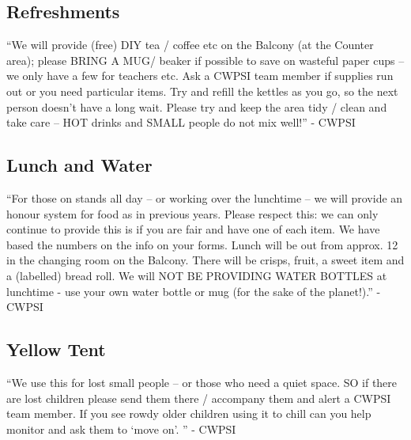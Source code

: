 \documentclass[a4paper]{article}
\begin{document}
\subsection*{Refreshments}
``We will provide (free) DIY tea / coffee etc on the Balcony (at the Counter area); please BRING A MUG/ beaker if possible to save on wasteful paper cups – we only have a few for teachers etc.   Ask a CWPSI team member if supplies run out or you need particular items.  Try and refill the kettles as you go, so the next person doesn’t have a long wait.  Please try and keep the area tidy / clean and take care – HOT drinks and SMALL people do not mix well!'' - CWPSI

\subsection*{Lunch and Water}
``For those on stands all day – or working over the lunchtime – we will provide an honour system for food as in previous years.  Please respect this: we can only continue to provide this is if you are fair and have one of each item. We have based the numbers on the info on your forms. Lunch will be out from approx. 12 in the changing room on the Balcony.  There will be crisps, fruit, a sweet item and a (labelled) bread roll.  We will NOT BE PROVIDING WATER BOTTLES at lunchtime - use your own water bottle or mug (for the sake of the planet!).'' - CWPSI

\subsection*{Yellow Tent}
``We use this for lost small people – or those who need a quiet space. SO if there are lost children please send them there / accompany them and alert a CWPSI team member.  If you see rowdy older children using it to chill can you help monitor and ask them to ‘move on’. '' - CWPSI
\end{document}
